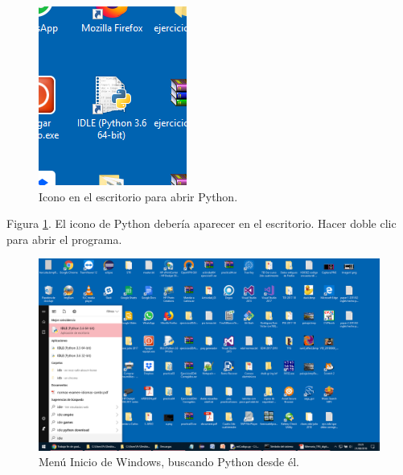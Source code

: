 \begin{figure}[h!]
  	\centering
	\includegraphics[width=\textwidth]{CapturasInstalacionPython/unnamed(7).png}
	\caption{Icono en el escritorio para abrir Python.
	\label{fig:CapturasInstalacionPython/unnamed(7).png}}
\end{figure}

Figura \ref{fig:CapturasInstalacionPython/unnamed(7).png}. El icono de Python debería aparecer en el escritorio. Hacer doble clic para abrir el programa.\\[20pt]

\begin{figure}[h!]
  	\centering
	\includegraphics[width=\textwidth]{CapturasInstalacionPython/unnamed(8).png}
	\caption{Menú Inicio de Windows, buscando Python desde él.
	\label{fig:CapturasInstalacionPython/unnamed(8).png}}
\end{figure}

